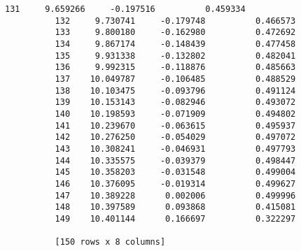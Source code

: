 \documentclass[11pt]{article}
\begin{document}
\begin{Verbatim}[commandchars=\\\{\}]
          131     9.659266     -0.197516          0.459334  
          132     9.730741     -0.179748          0.466573  
          133     9.800180     -0.162980          0.472692  
          134     9.867174     -0.148439          0.477458  
          135     9.931338     -0.132802          0.482041  
          136     9.992315     -0.118876          0.485663  
          137    10.049787     -0.106485          0.488529  
          138    10.103475     -0.093796          0.491124  
          139    10.153143     -0.082946          0.493072  
          140    10.198593     -0.071909          0.494802  
          141    10.239670     -0.063615          0.495937  
          142    10.276250     -0.054029          0.497072  
          143    10.308241     -0.046931          0.497793  
          144    10.335575     -0.039379          0.498447  
          145    10.358203     -0.031548          0.499004  
          146    10.376095     -0.019314          0.499627  
          147    10.389228      0.002006          0.499996  
          148    10.397589      0.093868          0.415081  
          149    10.401144      0.166697          0.322297  
          
          [150 rows x 8 columns]
\end{Verbatim}
            

    
    
    
    
\end{document}
